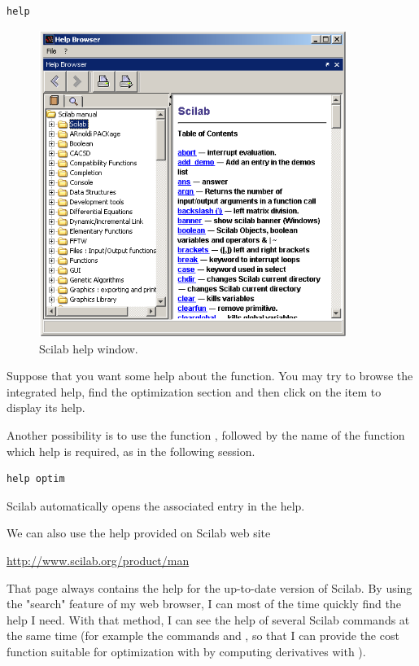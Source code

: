 \lstset{language=scilabscript}
\begin{lstlisting}
help
\end{lstlisting}

\begin{figure}
\begin{center}
\includegraphics[width=10cm]{introscilab/scilab-help.png}
\end{center}
\caption{Scilab help window.}
\label{fig-scilab-help}
\end{figure}

Suppose that you want some help about the 
function. You may try to browse the integrated help, find the optimization
section and then click on the  item
to display its help.

Another possibility is to use the function , followed 
by the name of the function which help is required, as in the following 
session.
\lstset{language=scilabscript}
\begin{lstlisting}
help optim
\end{lstlisting}
Scilab automatically opens the associated entry
in the help.

We can also use the help provided on Scilab web site
\begin{center}
\url{http://www.scilab.org/product/man}
\end{center}

That page always contains the help for the up-to-date
version of Scilab. By using the "search" feature of my
web browser, I can most of the time quickly find the help 
I need. With that method, I can see the help of several Scilab 
commands at the same time (for example the commands 
and , so that I can provide the cost function
suitable for optimization with  by computing
derivatives with ).

